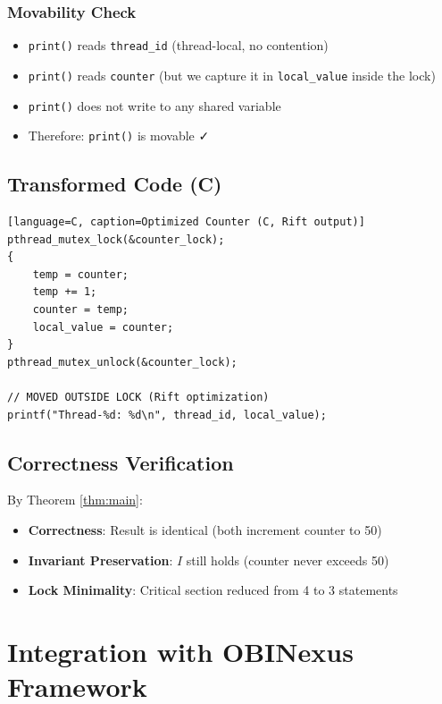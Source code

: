\documentclass[11pt]{article}
\begin{document}
\subsubsection{Movability Check}

\begin{itemize}
    \item \texttt{print()} reads \texttt{thread\_id} (thread-local, no contention)
    \item \texttt{print()} reads \texttt{counter} (but we capture it in \texttt{local\_value} inside the lock)
    \item \texttt{print()} does not write to any shared variable
    \item Therefore: \texttt{print()} is movable ✓
\end{itemize}

\subsection{Transformed Code (C)}

\begin{lstlisting}[language=C, caption=Optimized Counter (C, Rift output)]
pthread_mutex_lock(&counter_lock);
{
    temp = counter;
    temp += 1;
    counter = temp;
    local_value = counter;
}
pthread_mutex_unlock(&counter_lock);

// MOVED OUTSIDE LOCK (Rift optimization)
printf("Thread-%d: %d\n", thread_id, local_value);
\end{lstlisting}

\subsection{Correctness Verification}

By Theorem \ref{thm:main}:
\begin{itemize}
    \item \textbf{Correctness}: Result is identical (both increment counter to 50)
    \item \textbf{Invariant Preservation}: $I$ still holds (counter never exceeds 50)
    \item \textbf{Lock Minimality}: Critical section reduced from 4 to 3 statements
\end{itemize}

\section{Integration with OBINexus Framework}
\end{document}

